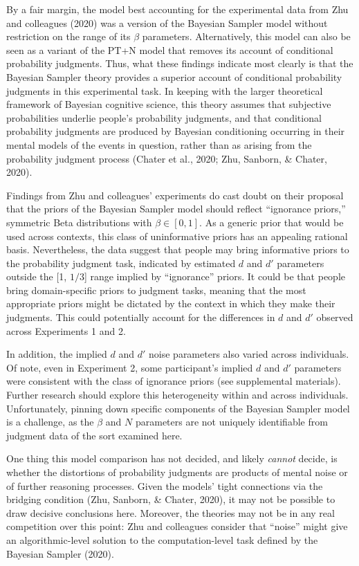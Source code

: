 \documentclass[
  english,
  man,floatsintext]{apa6}
\begin{document}
By a fair margin, the model best accounting for the experimental data from Zhu and colleagues (2020) was a version of the Bayesian Sampler model without restriction on the range of its \(\beta\) parameters. Alternatively, this model can also be seen as a variant of the PT+N model that removes its account of conditional probability judgments. Thus, what these findings indicate most clearly is that the Bayesian Sampler theory provides a superior account of conditional probability judgments in this experimental task. In keeping with the larger theoretical framework of Bayesian cognitive science, this theory assumes that subjective probabilities underlie people's probability judgments, and that conditional probability judgments are produced by Bayesian conditioning occurring in their mental models of the events in question, rather than as arising from the probability judgment process (Chater et al., 2020; Zhu, Sanborn, \& Chater, 2020).

Findings from Zhu and colleagues' experiments do cast doubt on their proposal that the priors of the Bayesian Sampler model should reflect ``ignorance priors,'' symmetric Beta distributions with \(\beta \in [0, 1]\). As a generic prior that would be used across contexts, this class of uninformative priors has an appealing rational basis. Nevertheless, the data suggest that people may bring informative priors to the probability judgment task, indicated by estimated \(d\) and \(d'\) parameters outside the {[}1, \(1/3\){]} range implied by ``ignorance'' priors. It could be that people bring domain-specific priors to judgment tasks, meaning that the most appropriate priors might be dictated by the context in which they make their judgments. This could potentially account for the differences in \(d\) and \(d'\) observed across Experiments 1 and 2.

In addition, the implied \(d\) and \(d'\) noise parameters also varied across individuals. Of note, even in Experiment 2, some participant's implied \(d\) and \(d'\) parameters were consistent with the class of ignorance priors (see supplemental materials). Further research should explore this heterogeneity within and across individuals. Unfortunately, pinning down specific components of the Bayesian Sampler model is a challenge, as the \(\beta\) and \(N\) parameters are not uniquely identifiable from judgment data of the sort examined here.

One thing this model comparison has not decided, and likely \emph{cannot} decide, is whether the distortions of probability judgments are products of mental noise or of further reasoning processes. Given the models' tight connections via the bridging condition (Zhu, Sanborn, \& Chater, 2020), it may not be possible to draw decisive conclusions here. Moreover, the theories may not be in any real competition over this point: Zhu and colleagues consider that ``noise'' might give an algorithmic-level solution to the computation-level task defined by the Bayesian Sampler (2020).
\end{document}
